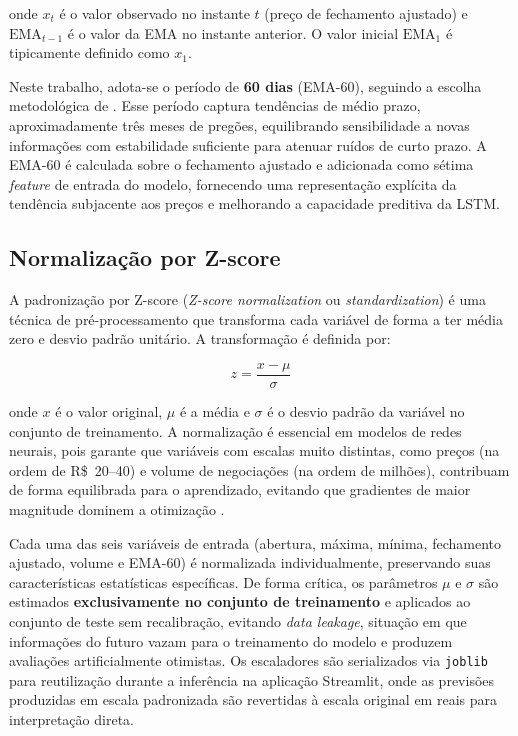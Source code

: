 \documentclass[12pt]{article}
\begin{document}
onde $x_t$ é o valor observado no instante $t$ (preço de fechamento ajustado)
e $\text{EMA}_{t-1}$ é o valor da EMA no instante anterior. O valor inicial
$\text{EMA}_1$ é tipicamente definido como $x_1$.

Neste trabalho, adota-se o período de \textbf{60 dias} (EMA-60), seguindo a
escolha metodológica de \cite{zanotto:2026}. Esse período captura tendências
de médio prazo, aproximadamente três meses de pregões, equilibrando
sensibilidade a novas informações com estabilidade suficiente para atenuar
ruídos de curto prazo. A EMA-60 é calculada sobre o fechamento ajustado e
adicionada como sétima \textit{feature} de entrada do modelo, fornecendo
uma representação explícita da tendência subjacente aos preços e melhorando
a capacidade preditiva da LSTM.

\subsection{Normalização por Z-score}

A padronização por Z-score (\textit{Z-score normalization} ou
\textit{standardization}) é uma técnica de pré-processamento que transforma
cada variável de forma a ter média zero e desvio padrão unitário. A
transformação é definida por:

\begin{equation}
  z = \frac{x - \mu}{\sigma}
\end{equation}

onde $x$ é o valor original, $\mu$ é a média e $\sigma$ é o desvio padrão
da variável no conjunto de treinamento. A normalização é essencial em modelos
de redes neurais, pois garante que variáveis com escalas muito distintas, 
como preços (na ordem de R\$~20--40) e volume de negociações (na ordem de
milhões), contribuam de forma equilibrada para o aprendizado, evitando que
gradientes de maior magnitude dominem a otimização \cite{zanotto:2026}.

Cada uma das seis variáveis de entrada (abertura, máxima, mínima, fechamento
ajustado, volume e EMA-60) é normalizada individualmente, preservando suas
características estatísticas específicas. De forma crítica, os parâmetros
$\mu$ e $\sigma$ são estimados \textbf{exclusivamente no conjunto de
treinamento} e aplicados ao conjunto de teste sem recalibração, evitando
\textit{data leakage}, situação em que informações do futuro vazam para o
treinamento do modelo e produzem avaliações artificialmente otimistas. Os
escaladores são serializados via \texttt{joblib} para reutilização durante
a inferência na aplicação Streamlit, onde as previsões produzidas em escala
padronizada são revertidas à escala original em reais para interpretação direta.
\end{document}
